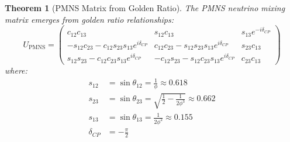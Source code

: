 \documentclass[12pt,a4paper]{article}
\newtheorem{theorem}{Theorem}[section]
\begin{document}
\begin{theorem}[PMNS Matrix from Golden Ratio]
\label{thm:pmns-matrix}
The PMNS neutrino mixing matrix emerges from golden ratio relationships:
\begin{equation}
U_{\text{PMNS}} = 
\begin{pmatrix}
c_{12}c_{13} & s_{12}c_{13} & s_{13}e^{-i\delta_{CP}} \\
-s_{12}c_{23} - c_{12}s_{23}s_{13}e^{i\delta_{CP}} & c_{12}c_{23} - s_{12}s_{23}s_{13}e^{i\delta_{CP}} & s_{23}c_{13} \\
s_{12}s_{23} - c_{12}c_{23}s_{13}e^{i\delta_{CP}} & -c_{12}s_{23} - s_{12}c_{23}s_{13}e^{i\delta_{CP}} & c_{23}c_{13}
\end{pmatrix}
\end{equation}
where:
\begin{align}
s_{12} &= \sin\theta_{12} = \frac{1}{\phi} \approx 0.618 \\
s_{23} &= \sin\theta_{23} = \sqrt{\frac{1}{2} - \frac{1}{2\phi^3}} \approx 0.662 \\
s_{13} &= \sin\theta_{13} = \frac{1}{2\phi^2} \approx 0.155 \\
\delta_{CP} &= -\frac{\pi}{2}
\end{align}
\end{theorem}
\end{document}
